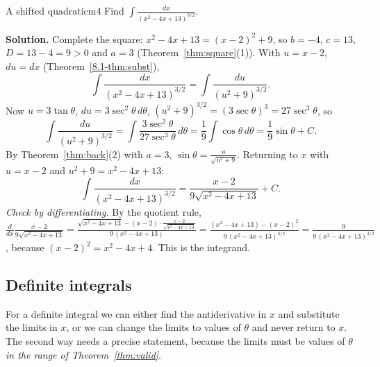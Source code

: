 \documentclass[11pt]{article}
\begin{document}
\begin{exmp}{A shifted quadratic}{m4}
Find $\displaystyle\int\frac{dx}{(x^2-4x+13)^{3/2}}$.

\textbf{Solution.} Complete the square: $x^2-4x+13=(x-2)^2+9$, so $b=-4$, $c=13$, $D=13-4=9>0$ and $a=3$ (Theorem~\ref{thm:square}(1)). With $u=x-2$, $du=dx$ (Theorem~\ref{8.1-thm:subst}),
\[\int\frac{dx}{(x^2-4x+13)^{3/2}}=\int\frac{du}{(u^2+9)^{3/2}} .\]
Now $u=3\tan\theta$, $du=3\sec^2\theta\,d\theta$, $(u^2+9)^{3/2}=(3\sec\theta)^3=27\sec^3\theta$, so
\[\int\frac{du}{(u^2+9)^{3/2}}=\int\frac{3\sec^2\theta}{27\sec^3\theta}\,d\theta=\frac19\int\cos\theta\,d\theta=\frac19\sin\theta+C .\]
By Theorem~\ref{thm:back}(2) with $a=3$, $\sin\theta=\frac u{\sqrt{u^2+9}}$. Returning to $x$ with $u=x-2$ and $u^2+9=x^2-4x+13$:
\[\int\frac{dx}{(x^2-4x+13)^{3/2}}=\frac{x-2}{9\sqrt{x^2-4x+13}}+C .\]
\emph{Check by differentiating.} By the quotient rule, $\frac{d}{dx}\frac{x-2}{9\sqrt{x^2-4x+13}}=\frac{\sqrt{x^2-4x+13}-(x-2)\cdot\frac{x-2}{\sqrt{x^2-4x+13}}}{9\,(x^2-4x+13)}=\frac{(x^2-4x+13)-(x-2)^2}{9\,(x^2-4x+13)^{3/2}}=\frac9{9\,(x^2-4x+13)^{3/2}}$, because $(x-2)^2=x^2-4x+4$. This is the integrand.
\end{exmp}

\subsection*{Definite integrals}

For a definite integral we can either find the antiderivative in $x$ and substitute the limits in $x$, or we can change the limits to values of $\theta$ and never return to $x$. The second way needs a precise statement, because the limits must be values of $\theta$ \emph{in the range of Theorem~\ref{thm:valid}}.
\end{document}
